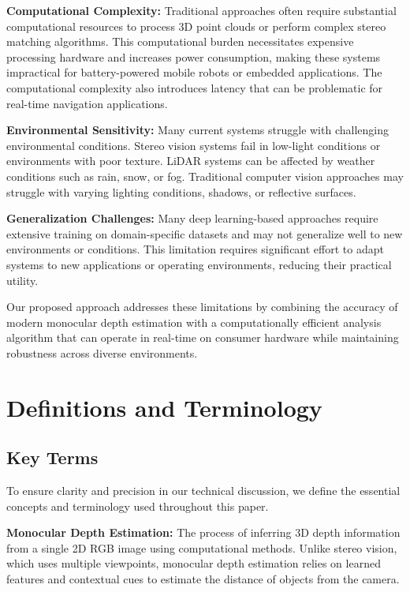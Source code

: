 \documentclass[conference]{IEEEtran}
\begin{document}
\textbf{Computational Complexity:} Traditional approaches often require substantial computational resources to process 3D point clouds or perform complex stereo matching algorithms. This computational burden necessitates expensive processing hardware and increases power consumption, making these systems impractical for battery-powered mobile robots or embedded applications. The computational complexity also introduces latency that can be problematic for real-time navigation applications.

\textbf{Environmental Sensitivity:} Many current systems struggle with challenging environmental conditions. Stereo vision systems fail in low-light conditions or environments with poor texture. LiDAR systems can be affected by weather conditions such as rain, snow, or fog. Traditional computer vision approaches may struggle with varying lighting conditions, shadows, or reflective surfaces.

\textbf{Generalization Challenges:} Many deep learning-based approaches require extensive training on domain-specific datasets and may not generalize well to new environments or conditions. This limitation requires significant effort to adapt systems to new applications or operating environments, reducing their practical utility.

Our proposed approach addresses these limitations by combining the accuracy of modern monocular depth estimation with a computationally efficient analysis algorithm that can operate in real-time on consumer hardware while maintaining robustness across diverse environments.

\section{Definitions and Terminology}

\subsection{Key Terms}
To ensure clarity and precision in our technical discussion, we define the essential concepts and terminology used throughout this paper.

\textbf{Monocular Depth Estimation:} The process of inferring 3D depth information from a single 2D RGB image using computational methods. Unlike stereo vision, which uses multiple viewpoints, monocular depth estimation relies on learned features and contextual cues to estimate the distance of objects from the camera.
\end{document}
